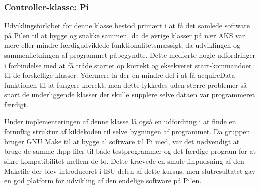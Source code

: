 \subsubsection{Controller-klasse: Pi} \label{sec:pi_class_impl}

Udviklingsforløbet for denne klasse bestod primært i at få det samlede software på Pi'en til at bygge og snakke sammen, da de øvrige klasser på nær AKS var mere eller mindre færdigudviklede funktionalitetsmæssigt, da udviklingen og sammenfletningen af programmet påbegyndte.
Dette medførte nogle udfordringer i forbindelse med at få tråde startet op korrekt og eksekveret start-kommandoer til de forskellige klasser.
Ydermere lå der en mindre del i at få acquireData funktionen til at fungere korrekt, men dette lykkedes uden større problemer så snart de underliggende klasser der skulle supplere selve dataen var programmeret færdigt.

Under implementeringen af denne klasse lå også en udfordring i at finde en fornuftig struktur af kildekoden til selve bygningen af programmet.
Da gruppen bruger GNU Make til at bygge al software til Pi med, var det nødvendigt at bruge de samme .hpp filer til både testprogrammer og det færdige program for at sikre kompatibilitet mellem de to.
Dette krævede en smule finpudsning af den Makefile der blev introduceret i ISU-delen\cite{lib:isu} af dette kursus, men slutresultatet gav en god platform for udvikling af den endelige software på Pi'en.